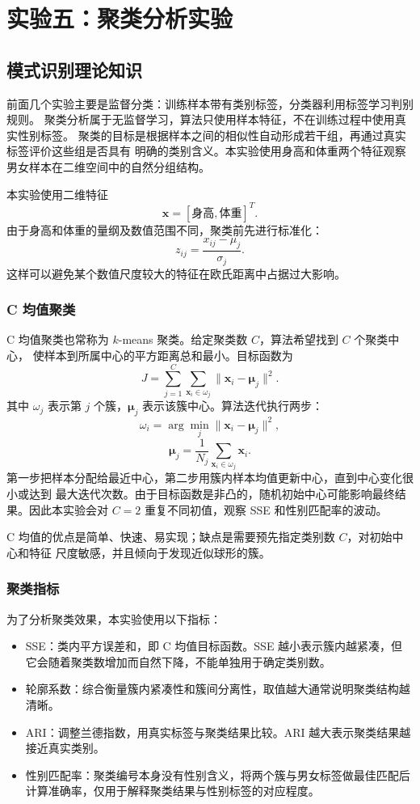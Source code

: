 \documentclass[UTF8,a4paper,12pt]{ctexart}
\begin{document}
\clearpage
\section{实验五：聚类分析实验}

\subsection{模式识别理论知识}

前面几个实验主要是监督分类：训练样本带有类别标签，分类器利用标签学习判别规则。
聚类分析属于无监督学习，算法只使用样本特征，不在训练过程中使用真实性别标签。
聚类的目标是根据样本之间的相似性自动形成若干组，再通过真实标签评价这些组是否具有
明确的类别含义。本实验使用身高和体重两个特征观察男女样本在二维空间中的自然分组结构。

本实验使用二维特征
\[
\boldsymbol{x}=[\text{身高},\text{体重}]^T.
\]
由于身高和体重的量纲及数值范围不同，聚类前先进行标准化：
\[
z_{ij}=\frac{x_{ij}-\mu_j}{\sigma_j}.
\]
这样可以避免某个数值尺度较大的特征在欧氏距离中占据过大影响。

\subsubsection{C 均值聚类}

C 均值聚类也常称为 $k$-means 聚类。给定聚类数 $C$，算法希望找到 $C$ 个聚类中心，
使样本到所属中心的平方距离总和最小。目标函数为
\[
J=\sum_{j=1}^{C}\sum_{\boldsymbol{x}_i\in \omega_j}\|\boldsymbol{x}_i-\boldsymbol{\mu}_j\|^2.
\]
其中 $\omega_j$ 表示第 $j$ 个簇，$\boldsymbol{\mu}_j$ 表示该簇中心。算法迭代执行两步：
\[
\omega_i=\arg\min_j\|\boldsymbol{x}_i-\boldsymbol{\mu}_j\|^2,
\]
\[
\boldsymbol{\mu}_j=\frac{1}{N_j}\sum_{\boldsymbol{x}_i\in \omega_j}\boldsymbol{x}_i.
\]
第一步把样本分配给最近中心，第二步用簇内样本均值更新中心，直到中心变化很小或达到
最大迭代次数。由于目标函数是非凸的，随机初始中心可能影响最终结果。因此本实验会对
$C=2$ 重复不同初值，观察 SSE 和性别匹配率的波动。

C 均值的优点是简单、快速、易实现；缺点是需要预先指定类别数 $C$，对初始中心和特征
尺度敏感，并且倾向于发现近似球形的簇。

\subsubsection{聚类指标}

为了分析聚类效果，本实验使用以下指标：
\begin{itemize}
  \item SSE：类内平方误差和，即 C 均值目标函数。SSE 越小表示簇内越紧凑，但它会随着聚类数增加而自然下降，不能单独用于确定类别数。
  \item 轮廓系数：综合衡量簇内紧凑性和簇间分离性，取值越大通常说明聚类结构越清晰。
  \item ARI：调整兰德指数，用真实标签与聚类结果比较。ARI 越大表示聚类结果越接近真实类别。
  \item 性别匹配率：聚类编号本身没有性别含义，将两个簇与男女标签做最佳匹配后计算准确率，仅用于解释聚类结果与性别标签的对应程度。
\end{itemize}
\end{document}
